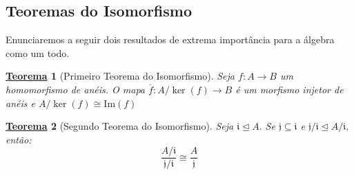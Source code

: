 \documentclass{article}
\newtheorem*{theorem*}{\underline{Teorema}}
\begin{document}
    \subsection{Teoremas do Isomorfismo}
    Enunciaremos a seguir dois resultados de extrema importância para a álgebra como um todo.
    \hypertarget{first_isomorphism}{
      \begin{theorem*}[Primeiro Teorema do Isomorfismo]
        Seja \(f:A\rightarrow B\) um homomorfismo de anéis. O mapa \(\overline{f}:A/\ker{(f)}\rightarrow B\)
        é um morfismo injetor de anéis e \(A/\ker{(f)}\cong{\mathrm{Im}(f)}\)
    \end{theorem*}}
    \hypertarget{second_isomorphism}{
      \begin{theorem*}[Segundo Teorema do Isomorfismo]
        Seja \(\mathfrak{i}\trianglelefteq{A}.\) Se \(\mathfrak{j}\subseteq \mathfrak{i}\) e \(\mathfrak{j}/\mathfrak{i}\trianglelefteq{A/\mathfrak{i}},\) então:
        \[
          \frac{A/\mathfrak{i}}{\mathfrak{j}/\mathfrak{i}}\cong{\frac{A}{\mathfrak{j}}}
        \]
    \end{theorem*}}
\end{document}
